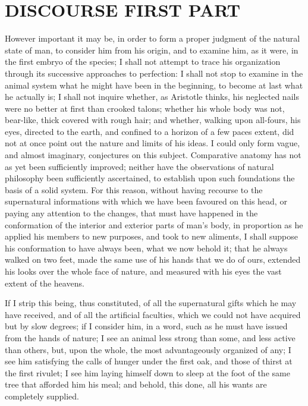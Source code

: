 \documentclass[11pt,twocolumn]{ltugboat}
\begin{document}
\section*{DISCOURSE FIRST PART}

However important it may be, in order to form a proper judgment of the
natural state of man, to consider him from his origin, and to examine
him, as it were, in the first embryo of the species; I shall not
attempt to trace his organization through its successive approaches to
perfection: I shall not stop to examine in the animal system what he
might have been in the beginning, to become at last what he actually
is; I shall not inquire whether, as Aristotle thinks, his neglected
nails were no better at first than crooked talons; whether his whole
body was not, bear-like, thick covered with rough hair; and whether,
walking upon all-fours, his eyes, directed to the earth, and confined
to a horizon of a few paces extent, did not at once point out the
nature and limits of his ideas. I could only form vague, and almost
imaginary, conjectures on this subject. Comparative anatomy has not as
yet been sufficiently improved; neither have the observations of
natural philosophy been sufficiently ascertained, to establish upon
such foundations the basis of a solid system. For this reason, without
having recourse to the supernatural informations with which we have
been favoured on this head, or paying any attention to the changes,
that must have happened in the conformation of the interior and
exterior parts of man's body, in proportion as he applied his members
to new purposes, and took to new aliments, I shall suppose his
conformation to have always been, what we now behold it; that he
always walked on two feet, made the same use of his hands that we do
of ours, extended his looks over the whole face of nature, and
measured with his eyes the vast extent of the heavens.

If I strip this being, thus constituted, of all the supernatural gifts
which he may have received, and of all the artificial faculties, which
we could not have acquired but by slow degrees; if I consider him, in
a word, such as he must have issued from the hands of nature; I see an
animal less strong than some, and less active than others, but, upon
the whole, the most advantageously organized of any; I see him
satisfying the calls of hunger under the first oak, and those of
thirst at the first rivulet; I see him laying himself down to sleep at
the foot of the same tree that afforded him his meal; and behold, this
done, all his wants are completely supplied.
\end{document}
